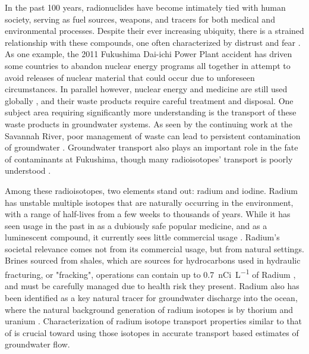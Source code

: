 \documentclass[twoside,12pt,titlepage]{article}
\newcommand{\isotope}[2]{\ch{^{#1}#2}}
\begin{document}
In the past 100 years, radionuclides have become intimately tied with human society, serving as fuel sources, weapons, and tracers for both medical and environmental processes. Despite their ever increasing ubiquity, there is a strained relationship with these compounds, one often characterized by distrust and fear \cite{Hohenemser1977}. As one example, the 2011 Fukushima Dai-ichi Power Plant accident has driven some countries to abandon nuclear energy programs all together in attempt to avoid releases of nuclear material that could occur due to unforeseen circumstances. In parallel however, nuclear energy and medicine are still used globally \cite{Ramana2013}, and their waste products require careful treatment and disposal. One subject area requiring significantly more understanding is the transport of these waste products in groundwater systems. As seen by the continuing work at the Savannah River, poor management of waste can lead to persistent contamination of groundwater \cite{Emerson2014}. Groundwater transport also plays an important role in the fate of contaminants at Fukushima, though many radioisotopes' transport is poorly understood \cite{Steinhauser2014}.
\par Among these radioisotopes, two elements stand out: radium and iodine. Radium has unstable multiple isotopes that are naturally occurring in the environment, with a range of half-lives from a few weeks to thousands of years. While it has seen usage in the past in as a dubiously safe popular medicine, and as a luminescent compound, it currently sees little commercial usage \cite{WikiRadium}. Radium's societal relevance comes not from its commercial usage, but from natural settings. Brines sourced from shales, which are sources for hydrocarbons used in hydraulic fracturing, or "fracking", operations can contain up to \SI{0.7}{\nano Ci\per\liter} of Radium \cite{Barbot2013}, and must be carefully managed due to health risk they present. Radium also has been identified as a key natural tracer for groundwater discharge into the ocean, where the natural background generation of radium isotopes is by thorium and uranium \cite{Moore2000}. Characterization of radium isotope transport properties similar to that of \isotope{137}{Cs} \cite{Steinhauser2014} is crucial toward using those isotopes in accurate transport based estimates of groundwater flow. 
\end{document}

